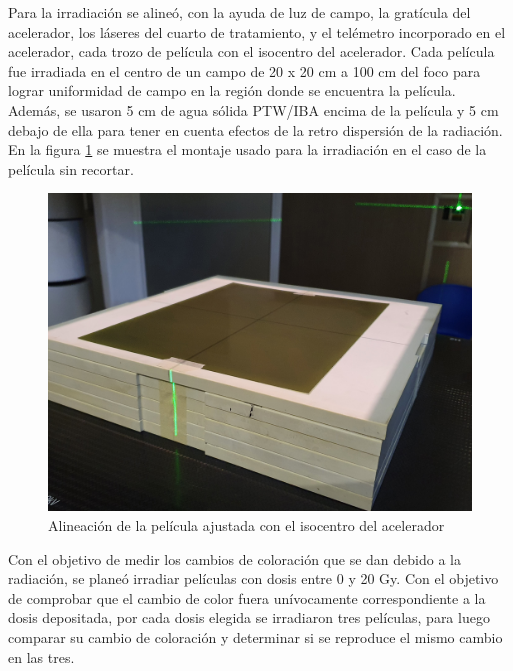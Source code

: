 Para la irradiación se alineó, con la ayuda de luz de campo, la gratícula del acelerador, los láseres del cuarto de tratamiento, y el telémetro incorporado en el acelerador, cada trozo de película con el isocentro del acelerador. Cada película fue irradiada en el centro de un campo de 20 x 20 cm a 100 cm del foco para lograr uniformidad de campo en la región donde se encuentra la película. Además, se usaron 5 cm de agua sólida PTW/IBA encima de la película y 5 cm debajo de ella para tener en cuenta efectos de la retro dispersión de la radiación. En la figura  \ref{fig:MontajePelicula} se muestra el montaje usado para la irradiación en el caso de la película sin recortar.\\
\begin{figure}
	\centering
	\includegraphics[width=0.7\linewidth]{images/alineacionCampo.jpg}
	\caption{Alineación de la película ajustada con el isocentro del acelerador}
	\label{fig:MontajePelicula}
\end{figure}

Con el objetivo de medir los cambios de coloración que se dan debido a la radiación, se planeó irradiar películas con dosis entre 0 y 20 Gy. Con el objetivo de comprobar que el cambio de color fuera unívocamente correspondiente a la dosis depositada, por cada dosis elegida se irradiaron tres películas, para luego comparar su cambio de coloración y determinar si se reproduce el mismo cambio en las tres.\\ 



